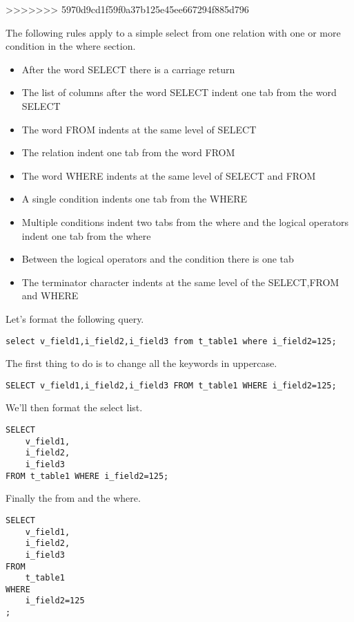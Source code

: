 \begin{itemize}
\begin{itemize}
\end{itemize}
>>>>>>> 5970d9cd1f59f0a37b125e45ee667294f885d796

The following rules apply to a simple select from one relation with one or more condition in the where section.
\begin{itemize}
 \item After the word SELECT there is a carriage return
 \item The list of columns after the word SELECT indent one tab from the word SELECT
 \item The word FROM indents at the same level of SELECT 
 \item The relation indent one tab from the word FROM
 \item The word WHERE indents at the same level of SELECT and FROM
 \item A single condition indents one tab from the WHERE 
 \item Multiple conditions indent two tabs from the where and the logical operators indent one tab from the where
 \item Between the logical operators and the condition there is one tab
 \item The terminator character indents at the same level of the SELECT,FROM and WHERE
\end{itemize}

Let's format the following query.

\begin{lstlisting}[style=pgsql]
 select v_field1,i_field2,i_field3 from t_table1 where i_field2=125;
\end{lstlisting}

The first thing to do is to change all the keywords in uppercase.

\begin{lstlisting}[style=pgsql]
 SELECT v_field1,i_field2,i_field3 FROM t_table1 WHERE i_field2=125;
\end{lstlisting}

We'll then format the select list.

\begin{lstlisting}[style=pgsql]
SELECT 
	v_field1,
	i_field2,
	i_field3 
FROM t_table1 WHERE i_field2=125;
\end{lstlisting}

Finally the from and the where.

\begin{lstlisting}[style=pgsql]
SELECT 
	v_field1,
	i_field2,
	i_field3 
FROM 
	t_table1 
WHERE 
	i_field2=125
;
\end{lstlisting}



\end{itemize}
